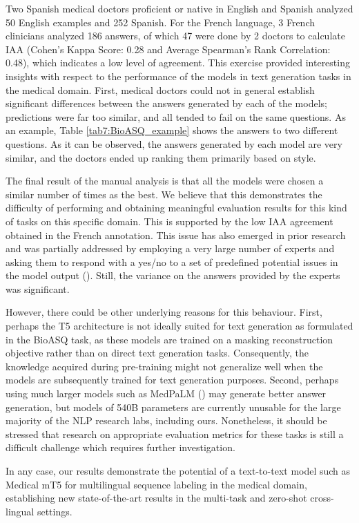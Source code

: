 Two Spanish medical doctors proficient or native in English and Spanish analyzed 50 English examples and 252 Spanish. For the French language, 3 French clinicians analyzed 186 answers, of which 47 were done by 2 doctors to calculate IAA (Cohen's Kappa Score: 0.28 and Average Spearman's Rank Correlation: 0.48), which indicates a low level of agreement. This exercise provided interesting insights with respect to the performance of the models in text generation tasks in the medical domain. First, medical doctors could not in general establish significant differences between the
answers generated by each of the models; predictions were far too similar, and all tended to
fail on the same questions. As an example, Table \ref{tab7:BioASQ_example} shows the answers to two different questions. As it can be observed, the answers generated by each model are very similar, and the doctors ended up ranking them primarily based on style. 

The final result of the manual analysis is that all the models were chosen a similar number of times as the best. 
We believe that this demonstrates the difficulty of performing and obtaining meaningful evaluation results for this kind of tasks on this specific domain. This is supported by the low IAA agreement obtained in the French annotation. This issue has also emerged in prior research and was partially addressed by employing a very large number of experts and asking them to respond with a yes/no to a set of predefined potential issues in the model output (\cite{singhal-palm}). Still, the variance on the answers provided by the experts was significant.

However, there could be other underlying reasons for this behaviour. First, perhaps the T5 architecture is not ideally suited for text generation as formulated in the BioASQ task, as these models are trained on a masking reconstruction objective rather than on direct text generation tasks. Consequently, the knowledge acquired during pre-training might not generalize well when the models are subsequently trained for text generation purposes. Second, perhaps using much larger models such as MedPaLM (\cite{singhal-palm}) may generate better answer generation, but models of 540B parameters are currently unusable for the large majority of the NLP research labs, including ours. Nonetheless, it should be stressed that research on appropriate evaluation metrics for these tasks is still a difficult challenge which requires further investigation. 

In any case, our results demonstrate the potential of a text-to-text model such as Medical mT5 for multilingual sequence labeling in the medical domain, establishing new state-of-the-art results in the multi-task and zero-shot cross-lingual settings.

